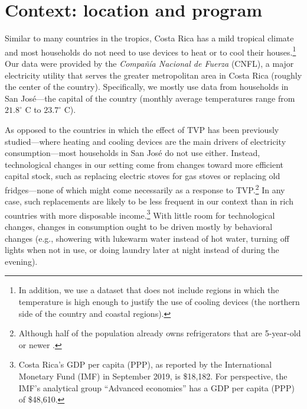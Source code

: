 \documentclass[12pt]{article}
\begin{document}
\section{Context: location and program}

Similar to many countries in the tropics, Costa Rica has a mild tropical climate and most households do not need to use devices to heat or to cool their houses.\footnote{In addition, we use a dataset that does not include regions in which the temperature is high enough to justify the use of cooling devices (the northern side of the country and coastal regions).} Our data were provided by the \emph{Compañía Nacional de Fuerza} (CNFL), a major electricity utility that serves the greater metropolitan area in Costa Rica (roughly the center of the country). Specifically, we mostly use data from households in San José---the capital of the country (monthly average temperatures range from $21.8 ^{\circ}$  C to $23.7^{\circ}$ C).

As opposed to the countries in which the effect of TVP has been previously studied---where heating and cooling devices are the main drivers of electricity consumption---most households in San José do not use either. Instead, technological changes in our setting come from changes toward more efficient capital stock, such as replacing electric stoves for gas stoves or replacing old fridges---none of which might come necessarily as a response to TVP.\footnote{ Although half of the population already owns refrigerators that are 5-year-old or newer \citep{ministeriodeambienteyenergiaEstudioParaCaracterizacion2019}.} In any case, such replacements are likely to be less frequent in our context than in rich countries with more disposable income.\footnote{Costa Rica’s GDP per capita (PPP), as reported by the International Monetary Fund (IMF) in September 2019, is \$18,182. For perspective, the IMF’s analytical group \enquote{Advanced economies} has a GDP per capita (PPP) of \$48,610.} With little room for technological changes, changes in consumption ought to be driven mostly by behavioral changes (e.g., showering with lukewarm water instead of hot water, turning off lights when not in use, or doing laundry later at night instead of during the evening).
\end{document}
